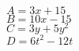 \documentclass[a4paper,11pt,fleqn]{article}
\begin{document}
\begin{correction}
\begin{multicols}{2}
\exo{}


\begin{multicols}{2}
$A=3x+15$\\
$B=10x-15$\\
$C=3y+5y^2$\\
$D=6t^2-12t$
\end{multicols}

\end{multicols}

	


	
\end{correction}
\end{document}

